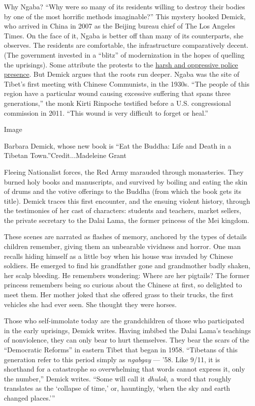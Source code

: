 Why Ngaba? ``Why were so many of its residents willing to destroy their
bodies by one of the most horrific methods imaginable?'' This mystery
hooked Demick, who arrived in China in 2007 as the Beijing bureau chief
of The Los Angeles Times. On the face of it, Ngaba is better off than
many of its counterparts, she observes. The residents are comfortable,
the infrastructure comparatively decent. (The government invested in a
``blitz'' of modernization in the hopes of quelling the uprisings). Some
attribute the protests to the
\href{https://www.nytimes3xbfgragh.onion/2012/06/03/world/asia/wave-of-tibet-self-immolations-challenges-chinese-rule.html}{harsh
and oppressive police presence}. But Demick argues that the roots run
deeper. Ngaba was the site of Tibet's first meeting with Chinese
Communists, in the 1930s. ``The people of this region have a particular
wound causing excessive suffering that spans three generations,'' the
monk Kirti Rinpoche testified before a U.S. congressional commission in
2011. ``This wound is very difficult to forget or heal.''

Image

Barbara Demick, whose new book is ``Eat the Buddha: Life and Death in a
Tibetan Town.''Credit...Madeleine Grant

Fleeing Nationalist forces, the Red Army marauded through monasteries.
They burned holy books and manuscripts, and survived by boiling and
eating the skin of drums and the votive offerings to the Buddha (from
which the book gets its title). Demick traces this first encounter, and
the ensuing violent history, through the testimonies of her cast of
characters: students and teachers, market sellers, the private secretary
to the Dalai Lama, the former princess of the Mei kingdom.

These scenes are narrated as flashes of memory, anchored by the types of
details children remember, giving them an unbearable vividness and
horror. One man recalls hiding himself as a little boy when his house
was invaded by Chinese soldiers. He emerged to find his grandfather gone
and grandmother badly shaken, her scalp bleeding. He remembers
wondering: Where are her pigtails? The former princess remembers being
so curious about the Chinese at first, so delighted to meet them. Her
mother joked that she offered grass to their trucks, the first vehicles
she had ever seen. She thought they were horses.

Those who self-immolate today are the grandchildren of those who
participated in the early uprisings, Demick writes. Having imbibed the
Dalai Lama's teachings of nonviolence, they can only bear to hurt
themselves. They bear the scars of the ``Democratic Reforms'' in eastern
Tibet that began in 1958. ``Tibetans of this generation refer to this
period simply as \emph{ngabgay} --- '58. Like 9/11, it is shorthand for
a catastrophe so overwhelming that words cannot express it, only the
number,'' Demick writes. ``Some will call it \emph{dhulok}, a word that
roughly translates as the `collapse of time,' or, hauntingly, `when the
sky and earth changed places.'''

